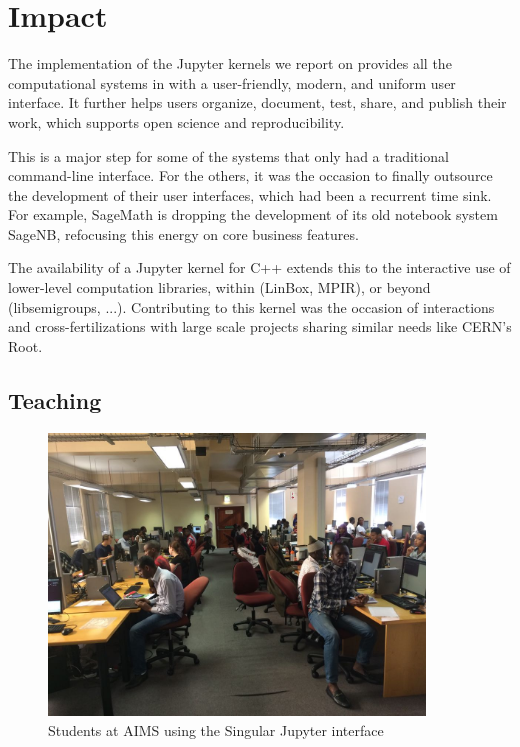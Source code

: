 \documentclass{deliverablereport}
\begin{document}
\section{Impact}

The implementation of the Jupyter kernels we report on provides all
the computational systems in \ODK with a user-friendly, modern, and
uniform user interface. It further helps users organize, document,
test, share, and publish their work, which supports open science and
reproducibility.

This is a major step for some of the systems that only had a
traditional command-line interface. For the others, it was the
occasion to finally outsource the development of their user
interfaces, which had been a recurrent time sink. For example,
SageMath is dropping the development of its old notebook system
SageNB, refocusing this energy on core business features.

The availability of a Jupyter kernel for C++ extends this to the
interactive use of lower-level computation libraries, within \ODK
(LinBox, MPIR), or beyond (libsemigroups, ...). Contributing to this
kernel was the occasion of interactions and cross-fertilizations with
large scale projects sharing similar needs like CERN's Root.

\subsection{Teaching}\label{teaching}

\begin{figure}\label{AIMS}
\includegraphics[width=100mm]{IMG-20180124-WA0000.jpg}
\caption{Students at AIMS using the Singular Jupyter interface}
\end{figure}
\end{document}
